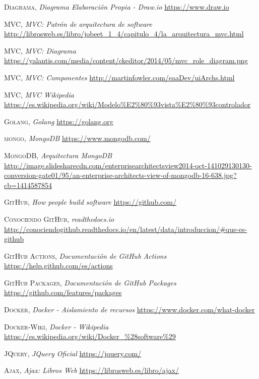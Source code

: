 \documentclass[a4paper,11pt]{book}
\begin{document}
\begin{thebibliography}{aaaa}


 \textsc{Diagrama},
\textit{Diagrama Elaboración Propia - Draw.io}
\url{https://www.draw.io}

 \textsc{MVC},
\textit{MVC: Patrón de arquitectura de software }
\url{http://librosweb.es/libro/jobeet_1_4/capitulo_4/la_arquitectura_mvc.html}

 \textsc{MVC},
\textit{MVC: Diagrama}
\url{https://yalantis.com/media/content/ckeditor/2014/05/mvc_role_diagram.png}

 \textsc{MVC},
\textit{MVC: Componentes}
\url{http://martinfowler.com/eaaDev/uiArchs.html}

 \textsc{MVC},
\textit{MVC Wikipedia}
\url{https://es.wikipedia.org/wiki/Modelo%E2%80%93vista%E2%80%93controlador}


 \textsc{Golang},
\textit{Golang}
\url{https://golang.org}

 \textsc{mongo},
\textit{MongoDB}
\url{https://www.mongodb.com/}

 \textsc{MongoDB},
\textit{Arquitectura MongoDB}
\url{http://image.slidesharecdn.com/enterprisearchitectsview2014-oct-141029130130-conversion-gate01/95/an-enterprise-architects-view-of-mongodb-16-638.jpg?cb=1414587854}


 \textsc{GitHub},
\textit{How people build software}
\url{https://github.com/}


 \textsc{Conociendo GitHub},
\textit{readthedocs.io }
\url{http://conociendogithub.readthedocs.io/en/latest/data/introduccion/#que-es-github}

 \textsc{GitHub Actions},
\textit{Documentación de GitHub Actions }
\url{https://help.github.com/es/actions}


 \textsc{GitHub Packages},
\textit{Documentación de GitHub Packages }
\url{https://github.com/features/packages}

 \textsc{Docker},
\textit{Docker - Aislamiento de recursos}
\url{https://www.docker.com/what-docker} 

 \textsc{Docker-Wiki},
\textit{Docker - Wikipedia}
\url{https://es.wikipedia.org/wiki/Docker_\%28software\%29} 


 \textsc{JQuery},
\textit{JQuery Oficial}
\url{https://jquery.com/}


 \textsc{Ajax},
\textit{Ajax: Libros Web}
\url{https://librosweb.es/libro/ajax/}


\end{thebibliography}
\end{document}
